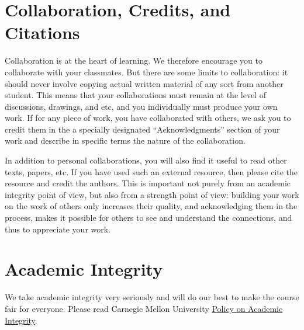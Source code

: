 \section{Collaboration, Credits, and Citations}


Collaboration is at the heart of learning.  We therefore encourage you to collaborate with your classmates.
%
But there are some limits to collaboration: it should never involve copying actual written material of any sort from another student.
%
This means that your collaborations must remain at the level of discussions, drawings, and etc, and you individually must produce your own work.
%
If for any piece of work, you have collaborated with others, we ask you to credit them in the a specially designated ``Acknowledgments'' section of your work and describe in specific terms the nature of the collaboration.


In addition to personal collaborations, you will also find it useful to read other texts, papers, etc.
%
If you have used such an external resource, then please cite the resource and credit  the authors.
%
This is important not purely from an academic integrity point of view, but also from a strength point of view:
%
building your work on the work of others only increases their quality, and acknowledging them in the process, makes it possible for others to see and understand the connections, and thus to appreciate your work.



\section{Academic Integrity}
We take academic integrity very seriously and will do our best to make the course fair for everyone. 
%
Please read Carnegie Mellon University 
%
\href{https://www.cmu.edu/policies/student-and-student-life/academic-integrity.html}
{Policy on Academic Integrity}. 






